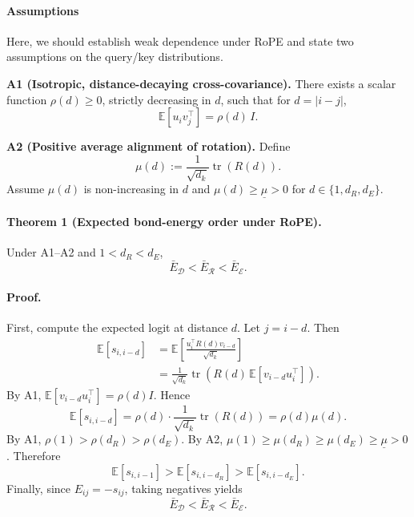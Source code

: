 \paragraph{Assumptions}
Here, we should establish weak dependence under RoPE and state two assumptions on the query/key distributions.

\noindent\textbf{A1 (Isotropic, distance-decaying cross-covariance).}
There exists a scalar function $\rho(d)\ge 0$, strictly decreasing in $d$, such that for $d=|i-j|$,
\begin{equation}
\mathbb{E}[u_i v_j^\top]=\rho(d)\,I.
\end{equation}

\noindent\textbf{A2 (Positive average alignment of rotation).}
Define
\begin{equation}
\mu(d):=\frac{1}{\sqrt{d_k}}\operatorname{tr}(R(d)).
\end{equation}
Assume $\mu(d)$ is non-increasing in $d$ and $\mu(d)\ge \underline{\mu}>0$ for $d\in\{1,d_R,d_E\}$. 

\paragraph{Theorem 1 (Expected bond-energy order under RoPE).}
Under A1--A2 and $1<d_R<d_E$,
\begin{equation}
\bar E_{\mathcal{D}} < \bar E_{\mathcal{R}} < \bar E_{\mathcal{E}}.
\end{equation}

\paragraph{Proof.}
First, compute the expected logit at distance $d$. Let $j=i-d$. Then
\begin{align}
\mathbb{E}[s_{i,i-d}]
&=\mathbb{E}\left[\frac{u_i^\top R(d)v_{i-d}}{\sqrt{d_k}}\right] \\
&=\frac{1}{\sqrt{d_k}}\operatorname{tr}\!\left(R(d)\,\mathbb{E}[v_{i-d}u_i^\top]\right).
\end{align}
By A1, $\mathbb{E}[v_{i-d}u_i^\top]=\rho(d)I$. Hence
\begin{equation}
\mathbb{E}[s_{i,i-d}] = \rho(d)\cdot \frac{1}{\sqrt{d_k}}\operatorname{tr}(R(d))=\rho(d)\mu(d).
\end{equation}
By A1, $\rho(1)>\rho(d_R)>\rho(d_E)$.
By A2, $\mu(1)\ge \mu(d_R)\ge \mu(d_E)\ge \underline{\mu}>0$.
Therefore
\begin{equation}
\mathbb{E}[s_{i,i-1}]>\mathbb{E}[s_{i,i-d_R}]>\mathbb{E}[s_{i,i-d_E}].
\end{equation}
Finally, since $E_{ij}=-s_{ij}$, taking negatives yields
\begin{equation}
\bar E_{\mathcal{D}} < \bar E_{\mathcal{R}} < \bar E_{\mathcal{E}}.
\end{equation}

